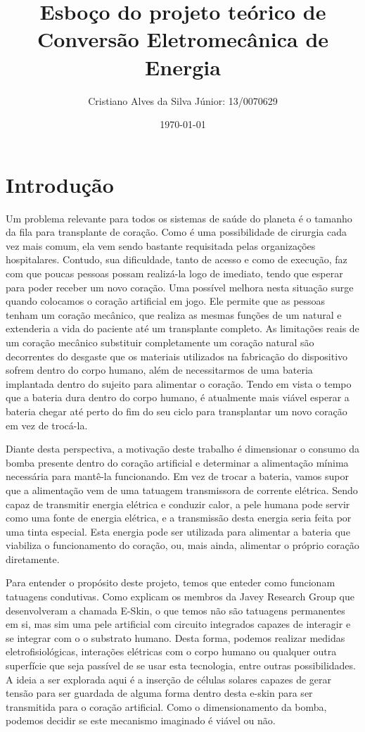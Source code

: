 \documentclass[12pt, a4paper, twoside]{article}
\begin{document}
\title{Esboço do projeto teórico de Conversão Eletromecânica de Energia}
\author{Cristiano Alves da Silva Júnior: 13/0070629}
\date{\today}
\maketitle

\section{Introdução}

Um problema relevante para todos os sistemas de saúde do planeta é o tamanho da fila para transplante de coração. Como é uma possibilidade de cirurgia cada vez mais comum, ela vem sendo bastante requisitada pelas organizações hospitalares. Contudo, sua dificuldade, tanto de acesso e como de execução, faz com que poucas pessoas possam realizá-la logo de imediato, tendo que esperar para poder receber um novo coração. Uma possível melhora nesta situação surge quando colocamos o coração artificial em jogo. Ele permite que as pessoas tenham um coração mecânico, que realiza as mesmas funções de um natural e extenderia a vida do paciente até um transplante completo. As limitações reais de um coração mecânico substituir completamente um coração natural são decorrentes do desgaste que os materiais utilizados na fabricação do dispositivo sofrem dentro do corpo humano, além de necessitarmos de uma bateria implantada dentro do sujeito para alimentar o coração. Tendo em vista o tempo que a bateria dura dentro do corpo humano, é atualmente mais viável esperar a bateria chegar até perto do fim do seu ciclo para transplantar um novo coração em vez de trocá-la.

Diante desta perspectiva, a motivação deste trabalho é dimensionar o consumo da bomba presente dentro do coração artificial e determinar a alimentação mínima necessária para mantê-la funcionando. Em vez de trocar a bateria, vamos supor que a alimentação vem de uma tatuagem transmissora de corrente elétrica. Sendo capaz de transmitir energia elétrica e conduzir calor, a pele humana pode servir como uma fonte de energia elétrica, e a transmissão desta energia seria feita por uma tinta especial. Esta energia pode ser utilizada para alimentar a bateria que viabiliza o funcionamento do coração, ou, mais ainda, alimentar o próprio coração diretamente.

Para entender o propósito deste projeto, temos que enteder como funcionam tatuagens condutivas. Como explicam os membros da Javey Research Group que desenvolveram a chamada E-Skin, o que temos não são tatuagens permanentes em si, mas sim uma pele artificial com circuito integrados capazes de interagir e se integrar com o o substrato humano. Desta forma, podemos realizar medidas eletrofisiológicas, interações elétricas com o corpo humano ou qualquer outra superfície que seja passível de se usar esta tecnologia, entre outras possibilidades. A ideia a ser explorada aqui é a inserção de células solares capazes de gerar tensão para ser guardada de alguma forma dentro desta e-skin para ser transmitida para o coração artificial. Como o dimensionamento da bomba, podemos decidir se este mecanismo imaginado é viável ou não.
\end{document}
